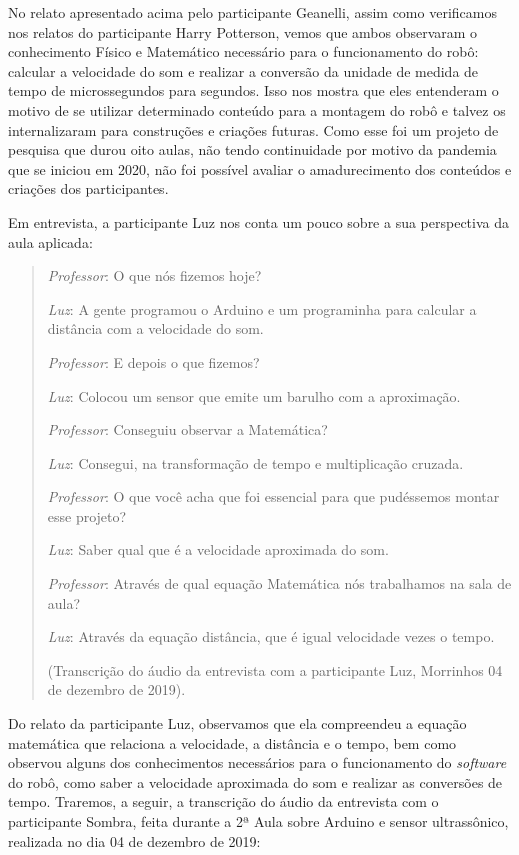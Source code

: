 \documentclass{textolivre}
\begin{document}
No relato apresentado acima pelo participante Geanelli, assim como verificamos nos relatos do participante Harry Potterson, vemos que ambos observaram o conhecimento Físico e Matemático necessário para o funcionamento do robô: calcular a velocidade do som e realizar a conversão da unidade de medida de tempo de microssegundos para segundos. Isso nos mostra que eles entenderam o motivo de se utilizar determinado conteúdo para a montagem do robô e talvez os internalizaram para construções e criações futuras. Como esse foi um projeto de pesquisa que durou oito aulas, não tendo continuidade por motivo da pandemia que se iniciou em 2020, não foi possível avaliar o amadurecimento dos conteúdos e criações dos participantes.

Em entrevista, a participante Luz nos conta um pouco sobre a sua perspectiva da aula aplicada:

\begin{quote}
\emph{Professor}: O que nós fizemos hoje?

\emph{Luz}: A gente programou o Arduino e um programinha para calcular a distância com a velocidade do som.

\emph{Professor}: E depois o que fizemos?

\emph{Luz}: Colocou um sensor que emite um barulho com a aproximação.

\emph{Professor}: Conseguiu observar a Matemática?

\emph{Luz}: Consegui, na transformação de tempo e multiplicação cruzada.

\emph{Professor}: O que você acha que foi essencial para que pudéssemos montar esse projeto?

\emph{Luz}: Saber qual que é a velocidade aproximada do som.

\emph{Professor}: Através de qual equação Matemática nós trabalhamos na sala de aula?

\emph{Luz}: Através da equação distância, que é igual velocidade vezes o tempo.

(Transcrição do áudio da entrevista com a participante Luz, Morrinhos 04 de dezembro de 2019).
\end{quote}

Do relato da participante Luz, observamos que ela compreendeu a equação matemática que relaciona a velocidade, a distância e o tempo, bem como observou alguns dos conhecimentos necessários para o funcionamento do \emph{software} do robô, como saber a velocidade aproximada do som e realizar as conversões de tempo. Traremos, a seguir, a transcrição do áudio da entrevista com o participante Sombra, feita durante a 2ª Aula sobre Arduino e sensor ultrassônico, realizada no dia 04 de dezembro de 2019:
\end{document}
